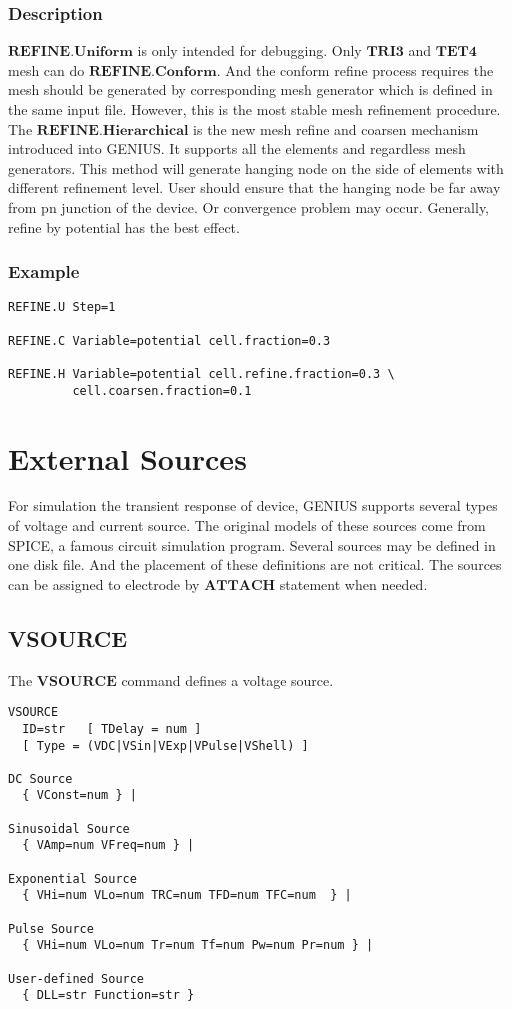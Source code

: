 \documentclass[oneside,12pt]{cgd_book}
\begin{document}
\subsubsection{Description}
$\mathbf{REFINE.Uniform}$ is only intended for debugging. Only $\mathbf{TRI3}$
and $\mathbf{TET4}$ mesh can do $\mathbf{REFINE.Conform}$. And the conform refine process
          requires the mesh should be generated by corresponding mesh generator which is defined in the same input file.
          However, this is the most stable mesh refinement procedure. The
$\mathbf{REFINE.Hierarchical}$ is the
          new mesh refine and coarsen mechanism introduced into GENIUS. It supports all the elements and regardless mesh
          generators. This method will generate hanging node on the side of elements with different refinement level.
          User should ensure that the hanging node be far away from pn junction of the device. Or convergence problem
          may occur. Generally, refine by potential has the best effect.
\par
\subsubsection{Example}
\par
\begin{lstlisting}[style=GeniusCode]
REFINE.U Step=1

REFINE.C Variable=potential cell.fraction=0.3

REFINE.H Variable=potential cell.refine.fraction=0.3 \
         cell.coarsen.fraction=0.1
\end{lstlisting}
\section{External Sources}
For simulation the transient response of device, GENIUS supports several types of voltage and current
      source. The original models of these sources come from SPICE, a famous circuit simulation program. Several sources
      may be defined in one disk file. And the placement of these definitions are not critical. The sources can be
      assigned to electrode by $\mathbf{ATTACH}$ statement when needed.
\par
\subsection{VSOURCE}
The $\mathbf{VSOURCE}$
command defines a voltage source.
\par
\begin{lstlisting}[style=GeniusCmd]
VSOURCE
  ID=str   [ TDelay = num ]
  [ Type = (VDC|VSin|VExp|VPulse|VShell) ]

DC Source
  { VConst=num } |

Sinusoidal Source
  { VAmp=num VFreq=num } |

Exponential Source
  { VHi=num VLo=num TRC=num TFD=num TFC=num  } |

Pulse Source
  { VHi=num VLo=num Tr=num Tf=num Pw=num Pr=num } |

User-defined Source
  { DLL=str Function=str }
\end{lstlisting}
\end{document}
